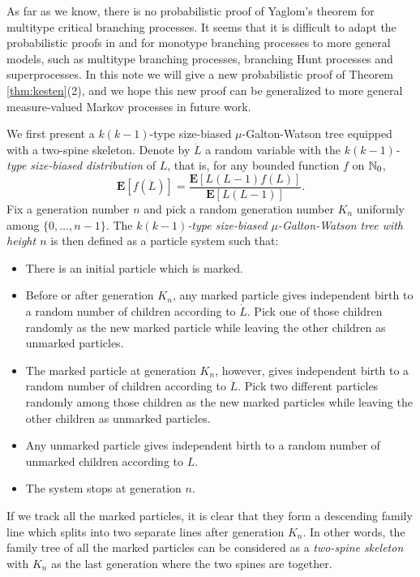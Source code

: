 \documentclass[12pt]{amsart}
\numberwithin{equation}{section}
\newcommand{\defn}[1]{{\em #1}}
\newcommand{\expr}[1]{\left( #1 \right)}
\newcommand{\brac}[1]{\left[ #1 \right]}
\newcommand{\expct}{\mathbf E}
\begin{document}
	As far as we know, there is no probabilistic proof of Yaglom's theorem for multitype critical branching processes. 
	It seems that it is difficult to adapt the probabilistic proofs in \cite{geiger2000new} and \cite{lyons1995conceptual} for monotype branching processes to more general models, such as multitype branching processes, branching Hunt processes and superprocesses.
	In this note we will give a new probabilistic proof of Theorem \ref{thm:kesten}(2), and we hope this new proof can be generalized to more general measure-valued Markov processes in future work.
\par
	We first present a $k(k-1)$-type size-biased $\mu$-Galton-Watson tree equipped with a two-spine skeleton.
	Denote by $\ddot L$ a random variable with the \defn{$k(k-1)$-type size-biased distribution} of $L$, that is, for any bounded function $f$ on $\mathbb N_0$,
\begin{equation*}
		\expct\brac{f\expr{\ddot L}}
	=
		\frac{\expct\brac{L(L-1)f(L)}}{\expct\brac{L(L-1)}}.
\end{equation*}
	Fix a generation number $n$ and pick a random generation number $K_n$ uniformly among $\{0,\dots,n-1\}$.
	The \defn{$k(k-1)$-type size-biased $\mu$-Galton-Watson tree with height $n$} is then defined as a particle system such that:
\begin{itemize}
\item
	There is an initial particle which is marked.
\item
	Before or after generation $K_n$, any marked particle gives independent birth to a random number of children according to $\dot L$.
	Pick one of those children randomly as the new marked particle while leaving the other children as unmarked particles.
\item
	The marked particle at generation $K_n$, however, gives independent birth to a random number of children according to $\ddot L$.
	Pick two different particles randomly among those children as the new marked particles while leaving the other children as unmarked particles.
\item
	Any unmarked particle gives independent birth to a random number of unmarked children according to $L$.
\item
	The system stops at generation $n$.
\end{itemize}
\par
	If we track all the marked particles, it is clear that they form a descending family line which splits into two separate lines after generation $K_n$.
	In other words, the family tree of all the marked particles can be considered as a \defn{two-spine skeleton} with $K_n$ as the last generation where the two spines are together.
\end{document}
